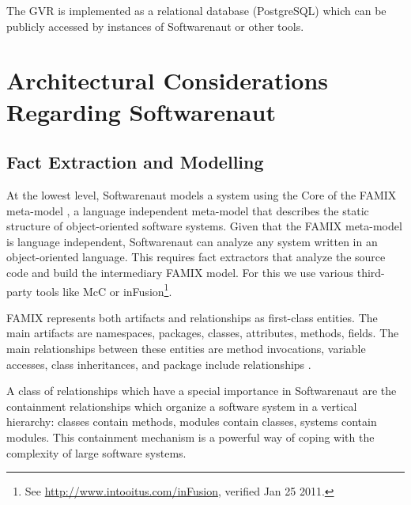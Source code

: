 \documentclass[preprint,12pt]{elsarticle}
\begin{document}
The GVR is implemented as a relational database (PostgreSQL) which can be publicly accessed by instances of Softwarenaut or other tools. %








\newpage
\section {Architectural Considerations Regarding Softwarenaut}


\subsection {Fact Extraction and Modelling} \label{sec:facts}

At the lowest level, Softwarenaut models a system using the Core of the FAMIX meta-model \cite{tichelaar-thesis}, a language independent meta-model that describes the static structure of object-oriented software systems. 
Given that the FAMIX meta-model is language independent, Softwarenaut can analyze any system written in an object-oriented language. This requires fact extractors that analyze the source code and build the intermediary FAMIX model. For this we use various third-party tools like McC \cite{pepi-mcc} or inFusion\footnote{See \url{http://www.intooitus.com/inFusion}, verified Jan 25 2011.}.

FAMIX represents both artifacts and relationships as first-class entities. The main artifacts are namespaces, packages, classes, attributes, methods, fields. The main relationships between these entities are method invocations, variable accesses, class inheritances, and package include relationships \cite{tichelaar-thesis}.

A class of relationships which have a special importance in Softwarenaut are the containment relationships which organize a software system in a vertical hierarchy: classes contain methods, modules contain classes, systems contain modules. This containment mechanism is a powerful way of coping with the complexity of large software systems.
\end{document}
